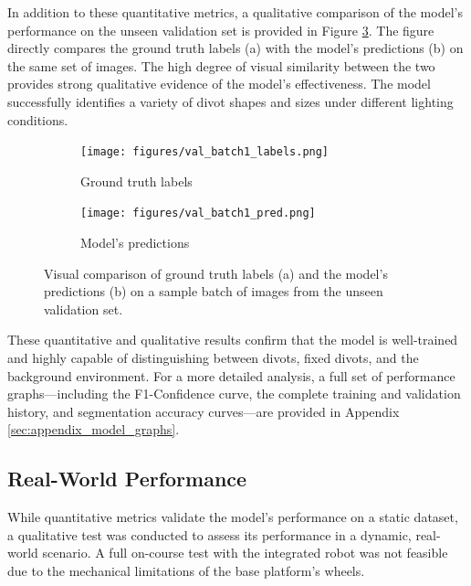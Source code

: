 In addition to these quantitative metrics, a qualitative comparison of the model's performance on the unseen validation set is provided in Figure \ref{fig:validation_comparison}. The figure directly compares the ground truth labels (a) with the model's predictions (b) on the same set of images. The high degree of visual similarity between the two provides strong qualitative evidence of the model's effectiveness. The model successfully identifies a variety of divot shapes and sizes under different lighting conditions.

\begin{figure}[h!]
    \centering
    \begin{subfigure}[b]{0.49\textwidth}
        \centering
        \texttt{[image: figures/val\_batch1\_labels.png]}
        \caption{Ground truth labels}
        \label{fig:val_labels}
    \end{subfigure}
    \hfill 
    \begin{subfigure}[b]{0.49\textwidth}
        \centering
        \texttt{[image: figures/val\_batch1\_pred.png]}
        \caption{Model's predictions}
        \label{fig:val_preds}
    \end{subfigure}
    \caption[Visual comparison of ground truth labels and the model's predictions.]%
    {Visual comparison of ground truth labels (a) and the model's predictions (b) on a sample batch of images from the unseen validation set.}
    \label{fig:validation_comparison}
\end{figure}

These quantitative and qualitative results confirm that the model is well-trained and highly capable of distinguishing between divots, fixed divots, and the background environment. For a more detailed analysis, a full set of performance graphs—including the F1-Confidence curve, the complete training and validation history, and segmentation accuracy curves—are provided in Appendix \ref{sec:appendix_model_graphs}.

\subsection{Real-World Performance}
\label{ssec:cv_real_world}

While quantitative metrics validate the model's performance on a static dataset, a qualitative test was conducted to assess its performance in a dynamic, real-world scenario. A full on-course test with the integrated robot was not feasible due to the mechanical limitations of the base platform's wheels.

